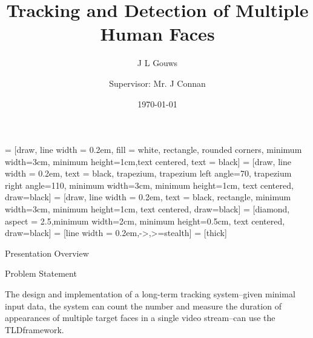 \documentclass[mathserif, 14pt, xcolor=svgnames]{beamer}
\title{Tracking and Detection of Multiple Human Faces }
\subtitle{}
\author[Gouws]{J L Gouws\inst{1}\\[1ex]  \and {\small Supervisor: Mr. J Connan\inst{1}}}
\date{\today}
\institute[RU]{\inst{1} Rhodes University}
\begin{document}
\begin{frame}
   \maketitle
\end{frame}

\usetikzlibrary{shapes.geometric, arrows}

 = [draw, line width = 0.2em, fill = white, rectangle, rounded corners, minimum width=3cm, minimum height=1cm,text centered, text = black]
 = [draw, line width = 0.2em, text = black, trapezium, trapezium left angle=70, trapezium right angle=110, minimum width=3cm, minimum height=1cm, text centered, draw=black]
 = [draw, line width = 0.2em, text = black, rectangle, minimum width=3cm, minimum height=1cm, text centered, draw=black]
 = [diamond, aspect = 2.5,minimum width=2cm, minimum height=0.5cm, text centered, draw=black]
 = [line width = 0.2em,->,>=stealth]
 = [thick]

\bgroup
\begin{frame}{Presentation Overview}
  \centering
\end{frame}
\egroup

\bgroup
\begin{frame}{Problem Statement}
  \begin{minipage}[t]{\textwidth}
  { \Large
    The design and implementation of a long-term tracking system\pause--given minimal input data,
    the system can count the number and measure the duration of appearances of multiple
    target faces in a single video stream\pause--can use the TLD\footnotemark[1] framework.
  }
  \end{minipage}
\end{frame}
\egroup
\end{document}
